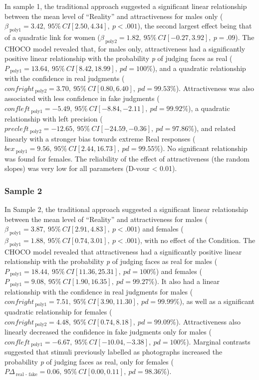 \documentclass[
  jou,
  floatsintext,
  longtable,
  nolmodern,
  notxfonts,
  notimes,
  colorlinks=true,linkcolor=blue,citecolor=blue,urlcolor=blue]{apa7}
\begin{document}
In sample 1, the traditional approach suggested a significant linear
relationship between the mean level of ``Reality'' and attractiveness
for males only
(\(\beta_{~\text{poly1}}=3.42, ~95\%~CI [2.50, 4.34], ~p < .001\)), the
second largest effect being that of a quadratic link for women
(\(\beta_{~\text{poly2}}=1.82, ~95\%~CI [-0.27, 3.92], ~p = .09\)). The
CHOCO model revealed that, for males only, attractiveness had a
significantly positive linear relationship with the probability \emph{p}
of judging faces as real
(\(P_{~\text{poly1}}=13.64, ~95\%~CI [8.42, 18.99], ~pd = 100\%\)), and
a quadratic relationship with the confidence in real judgments
(\(confright_{~\text{poly2}}=3.70, ~95\%~CI [0.80, 6.40], ~pd = 99.53\%\)).
Attractiveness was also associated with less confidence in fake
judgments
(\(confleft_{~\text{poly1}}=-5.49, ~95\%~CI [-8.84, -2.11], ~pd =  99.92\%\)),
a quadratic relationship with left precision
(\(precleft_{~\text{poly2}}=-12.65    , ~95\%~CI [-24.59, -0.36], ~pd = 97.86\%\)),
and related linearly with a stronger bias towards extreme Real responses
(\(bex_{~\text{poly1}}=9.56    , ~95\%~CI [2.44, 16.73], ~pd = 99.55\%\)).
No significant relationship was found for females. The reliability of
the effect of attractiveness (the random slopes) was very low for all
parameters (D-vour \textless{} 0.01).

\subsubsection{Sample 2}\label{sample-2}

In Sample 2, the traditional approach suggested a significant linear
relationship between the mean level of ``Reality'' and attractiveness
for males
(\(\beta_{~\text{poly1}}=3.87, ~95\%~CI [2.91, 4.83], ~p < .001\)) and
females
(\(\beta_{~\text{poly1}}=1.88, ~95\%~CI [0.74, 3.01], ~p < .001\)), with
no effect of the Condition. The CHOCO model revealed that attractiveness
had a significantly positive linear relationship with the probability
\emph{p} of judging faces as real for males
(\(P_{~\text{poly1}}=18.44, ~95\%~CI [11.36, 25.31], ~pd = 100\%\)) and
females
(\(P_{~\text{poly1}}=9.08, ~95\%~CI [1.90, 16.35], ~pd = 99.27\%\)). It
also had a linear relationship with the confidence in real judgments for
males
(\(confright_{~\text{poly1}}=7.51, ~95\%~CI [3.90, 11.30], ~pd = 99.99\%\)),
as well as a significant quadratic relationship for females
(\(confright_{~\text{poly2}}=4.48, ~95\%~CI [0.74, 8.18], ~pd = 99.09\%\)).
Attractiveness also linearly decreased the confidence in fake judgments
only for males
(\(confleft_{~\text{poly1}}=-6.67, ~95\%~CI [-10.04, -3.38], ~pd = 100\%\)).
Marginal contrasts suggested that stimuli previously labelled as
photographs increased the probability \emph{p} of judging faces as real,
only for females
(\(P \Delta_{~\text{real - fake}}=0.06, ~95\%~CI [0.00, 0.11], ~pd = 98.36\%\)).
\end{document}
